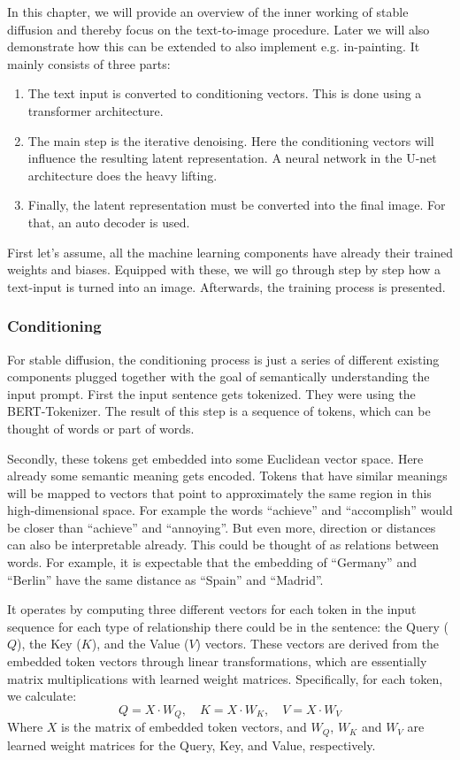 \documentclass[11pt]{article}
\begin{document}
In this chapter, we will provide an overview of the inner working of stable diffusion and thereby focus on the text-to-image procedure. Later we will also demonstrate how this can be extended to also implement e.g. in-painting. It mainly consists of three parts:
\begin{enumerate}
    \item The text input is converted to conditioning vectors. This is done using a transformer architecture.
    \item The main step is the iterative denoising. Here the conditioning vectors will influence the resulting latent representation. A neural network in the U-net architecture does the heavy lifting.
    \item Finally, the latent representation must be converted into the final image. For that, an auto decoder is used. 
\end{enumerate}

First let's assume, all the machine learning components have already their trained weights and biases. Equipped with these, we will go through step by step how a text-input is turned into an image. Afterwards, the training process is presented.

\subsubsection{Conditioning}
For stable diffusion, the conditioning process is just a series of different existing components plugged together with the goal of semantically understanding the input prompt. First the input sentence gets tokenized. They were using the BERT-Tokenizer\cite{devlin2019bert}. The result of this step is a sequence of tokens, which can be thought of words or part of words. 

Secondly, these tokens get embedded into some Euclidean vector space. Here already some semantic meaning gets encoded. Tokens that have similar meanings will be mapped to vectors that point to approximately the same region in this high-dimensional space. For example the words “achieve” and “accomplish” would be closer than “achieve” and “annoying”. But even more, direction or distances can also be interpretable already. This could be thought of as relations between words. For example, it is expectable that the embedding of “Germany” and “Berlin” have the same distance as “Spain” and “Madrid”. 

It operates by computing three different vectors for each token in the input sequence for each type of relationship there could be in the sentence: the Query ($Q$), the Key ($K$), and the Value ($V$) vectors. These vectors are derived from the embedded token vectors through linear transformations, which are essentially matrix multiplications with learned weight matrices. Specifically, for each token, we calculate:
$$Q = X \cdot W_Q,\quad K = X\cdot W_K,\quad V = X \cdot W_V$$
Where $X$ is the matrix of embedded token vectors, and $W_Q$, $W_K$ and $W_V$ are learned weight matrices for the Query, Key, and Value, respectively.
\end{document}
